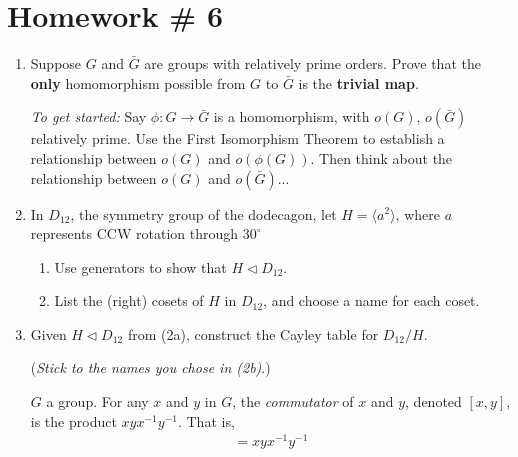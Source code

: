 \section{Homework \# 6}
\label{sec:HW6}
\begin{enumerate}
    \item Suppose \( G \) and \( \bar{G} \) are groups with relatively prime orders. Prove that the \textbf{only} homomorphism possible from \( G \) to \( \bar{G} \) is the \textbf{trivial map}. \\ \steezybreak
    
    \textit{To get started:} Say \( \phi: G \to \bar{G} \) is a homomorphism, with \( o(G) \), \( o(\bar{G}) \) relatively prime. Use the First Isomorphism Theorem to establish a relationship between \( o(G) \) and \( o(\phi(G)) \). Then think about the relationship between \( o(G) \) and \( o(\bar{G}) \)... \\ \steezybreak
    
    \item In \( D_{12} \), the symmetry group of the dodecagon, let \( H = \langle a^2 \rangle \), where \( a \) represents CCW rotation through \( 30^\circ \)
    
    \begin{enumerate}
        \item Use generators to show that \( H \triangleleft D_{12} \).
        \item List the (right) cosets of \( H \) in \( D_{12} \), and choose a name for each coset. \\ \steezybreak
    \end{enumerate}
    
    \item Given \( H \triangleleft D_{12} \) from (2a), construct the Cayley table for \( D_{12} / H \).
    
    (\textit{Stick to the names you chose in (2b)}.) \\
    
    \begin{definition}[Commutator]
        \( G \) a group. For any \( x \) and \( y \) in \( G \), the \textit{commutator} of \( x \) and \( y \), denoted \( [x,y] \), is the product \( xyx^{-1}y^{-1} \). That is,
        \begin{align*}
            [x,y] = xyx^{-1}y^{-1}
        \end{align*}
    \end{definition}
    

\end{enumerate}

